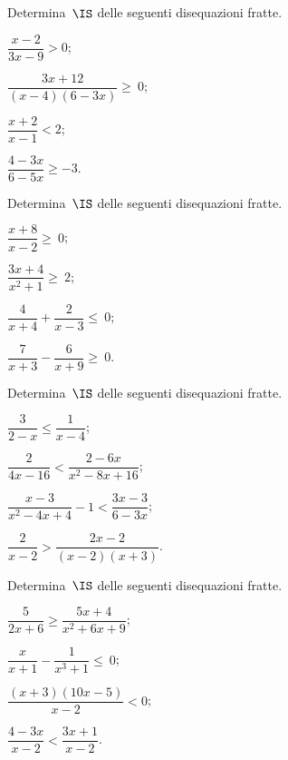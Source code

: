 \begin{esercizio}[\Ast]
\label{ese:21.55}
Determina~$\IS$ delle seguenti disequazioni fratte.
\begin{multicols}{2}
\begin{enumeratea}
\spazielenx
\item $\dfrac{x-2}{3x-9}>0$;
\item $\dfrac{3x+12}{(x-4)(6-3x)}\geqslant~0$;
\item $\dfrac{x+2}{x-1}<2$;
\item $\dfrac{4-3x}{6-5x}\geqslant -3$.
\end{enumeratea}
\end{multicols}
\end{esercizio}

\begin{esercizio}[\Ast]
\label{ese:21.56}
Determina~$\IS$ delle seguenti disequazioni fratte.
\begin{multicols}{2}
\begin{enumeratea}
\spazielenx
 \item $\dfrac{x+8}{x-2}\ge~0$;
\item $\dfrac{3x+4}{x^{2}+1}\ge~2$;
\item $\dfrac{4}{x+4}+\dfrac{2}{x-3}\leqslant~0$;
\item $\dfrac{7}{x+3}-\dfrac{6}{x+9}\geqslant~0$.
\end{enumeratea}
\end{multicols}
\end{esercizio}

\begin{esercizio}[\Ast]
\label{ese:21.57}
Determina~$\IS$ delle seguenti disequazioni fratte.
\begin{multicols}{2}
\begin{enumeratea}
\spazielenx
 \item $\dfrac{3}{2-x}\leqslant \dfrac{1}{x-4}$;
\item $\dfrac{2}{4x-16}<\dfrac{2-6x}{x^{2}-8x+16}$;
\item $\dfrac{x-3}{x^{2}-4x+4}-1<\dfrac{3x-3}{6-3x}$;
\item $\dfrac{2}{x-2}>\dfrac{2x-2}{(x-2)(x+3)}$.
\end{enumeratea}
\end{multicols}
\end{esercizio}

\begin{esercizio}[\Ast]
\label{ese:21.58}
Determina~$\IS$ delle seguenti disequazioni fratte.
\begin{multicols}{2}
\begin{enumeratea}
\spazielenx
 \item $\dfrac{5}{2x+6}\geqslant \dfrac{5x+4}{x^{2}+6x+9}$;
\item $\dfrac{x}{x+1}-\dfrac{1}{x^{3}+1}\le~0$;
\item $\dfrac{(x+3)(10x-5)}{x-2}<0$;
\item $\dfrac{4-3x}{x-2}<\dfrac{3x+1}{x-2}$.
\end{enumeratea}
\end{multicols}
\end{esercizio}

